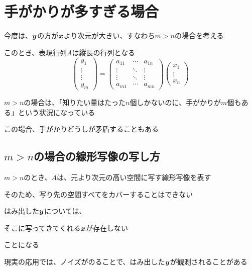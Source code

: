 \documentclass[../../../topic_linear-algebra]{subfiles}
\begin{document}
\sectionline
\section{手がかりが多すぎる場合}\label{sec:linear-map-m-greater-n}

今度は、$\vb*{y}$の方が$\vb*{x}$より次元が大きい、すなわち$m > n$の場合を考える

このとき、表現行列$A$は縦長の行列となる
\begin{equation*}
  \begin{pmatrix}
    y_1    \\
    \vdots \\
    \vdots \\
    y_m
  \end{pmatrix} = \begin{pmatrix}
    a_{11} & \cdots & a_{1n} \\
    \vdots & \ddots & \vdots \\
    \vdots & \ddots & \vdots \\
    a_{m1} & \cdots & a_{mn}
  \end{pmatrix} \begin{pmatrix}
    x_1    \\
    \vdots \\
    x_n
  \end{pmatrix}
\end{equation*}

$m > n$の場合は、「知りたい量はたった$n$個しかないのに、手がかりが$m$個もある」という状況になっている

この場合、手がかりどうしが矛盾することもある

\subsection{$m > n$の場合の線形写像の写し方}

$m > n$のとき、$A$は、元より次元の高い空間に写す線形写像を表す

そのため、写り先の空間すべてをカバーすることはできない

\br

はみ出した$\vb*{y}$については、
\begin{shaded}
  そこに写ってきてくれる$\vb*{x}$が存在しない
\end{shaded}
ことになる

\br

現実の応用では、ノイズがのることで、はみ出した$\vb*{y}$が観測されることがある
\end{document}
